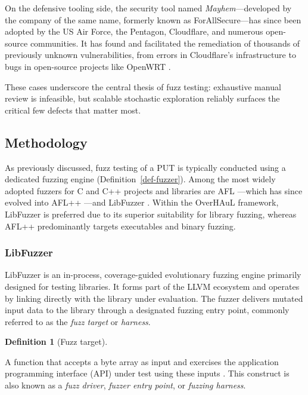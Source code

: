 \documentclass[
  a4paper,
]{scrreprt}
\theoremstyle{definition}
\newtheorem{definition}{Definition}[chapter]
\theoremstyle{remark}
\begin{document}
On the defensive tooling side, the security tool named
\emph{Mayhem}---developed by the company of the same name, formerly
known as ForAllSecure---has since been adopted by the US Air Force, the
Pentagon, Cloudflare, and numerous open-source communities. It has found
and facilitated the remediation of thousands of previously unknown
vulnerabilities, from errors in Cloudflare's infrastructure to bugs in
open-source projects like OpenWRT \autocite{simonite2020mayhem}.

These cases underscore the central thesis of fuzz testing: exhaustive
manual review is infeasible, but scalable stochastic exploration
reliably surfaces the critical few defects that matter most.

\subsection{Methodology}\label{methodology}

As previously discussed, fuzz testing of a PUT is typically conducted
using a dedicated fuzzing engine (Definition~\ref{def-fuzzer}). Among
the most widely adopted fuzzers for C and C++ projects and libraries are
AFL \autocite{afl}---which has since evolved into AFL++
\autocite{aflpp}---and LibFuzzer \autocite{libfuzzer}. Within the
OverHAuL framework, LibFuzzer is preferred due to its superior
suitability for library fuzzing, whereas AFL++ predominantly targets
executables and binary fuzzing.

\subsubsection{LibFuzzer}\label{libfuzzer}

LibFuzzer \autocite{libfuzzer} is an in-process, coverage-guided
evolutionary fuzzing engine primarily designed for testing libraries. It
forms part of the LLVM ecosystem \autocite{llvm} and operates by linking
directly with the library under evaluation. The fuzzer delivers mutated
input data to the library through a designated fuzzing entry point,
commonly referred to as the \emph{fuzz target} or \emph{harness}.

\begin{definition}[Fuzz
target]\protect\hypertarget{def-target}{}\label{def-target}

A function that accepts a byte array as input and exercises the
application programming interface (API) under test using these inputs
\autocite{libfuzzer}. This construct is also known as a \emph{fuzz
driver}, \emph{fuzzer entry point}, or \emph{fuzzing harness}.

\end{definition}
\end{document}
